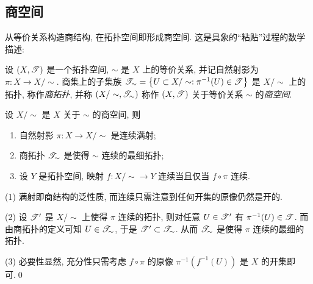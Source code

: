\subsection{商空间}

    从等价关系构造商结构, 在拓扑空间即形成商空间. 这是具象的``粘贴''过程的数学描述:

    \begin{Definition}[商空间]
        设 $ (X,\mathscr{T}) $ 是一个拓扑空间, $ \sim $ 是 $ X $ 上的等价关系, 并记自然射影为 $ \pi : X\to X/\sim $. 商集上的子集族 $ \mathscr{T}_\sim=\left\{ U\subset X/\sim : \pi^{-1}(U)\in\mathscr{T} \right\} $ 是 $ X/\sim $ 上的拓扑, 称作\emph{商拓扑}, 并称 $ (X/\sim,\mathscr{T}_\sim) $ 称作 $ (X,\mathscr{T}) $ 关于等价关系 $ \sim $ 的\emph{商空间}.
    \end{Definition}

    \begin{Proposition}
        设 $ X/\sim $ 是 $ X $ 关于 $ \sim $ 的商空间, 则
        \begin{enumerate}
            \item 自然射影 $ \pi : X\to X/\sim $ 是连续满射;
            \item 商拓扑 $ \mathscr{T}_\sim $ 是使得 $ \sim $ 连续的最细拓扑;
            \item 设 $ Y $ 是拓扑空间, 映射 $ f : X/\sim\to Y $ 连续当且仅当 $ f\circ\pi $ 连续.
        \end{enumerate}
        \begin{center}
        \end{center}
    \end{Proposition}
    \begin{Proof}
        (1) 满射即商结构的泛性质, 而连续只需注意到任何开集的原像仍然是开的.

        (2) 设 $ \mathscr{T}' $ 是 $ X/\sim $ 上使得 $ \pi $ 连续的拓扑, 则对任意 $ U\in\mathscr{T}' $ 有 $ \pi^{-1}(U)\in\mathscr{T} $. 而由商拓扑的定义可知 $ U\in\mathscr{T}_\sim $, 于是 $ \mathscr{T}'\subset\mathscr{T}_\sim $. 从而 $ \mathscr{T}_\sim $ 是使得 $ \pi $ 连续的最细的拓扑.

        (3) 必要性显然, 充分性只需考虑 $ f\circ\pi $ 的原像 $ \pi^{-1}(f^{-1}(U)) $ 是 $ X $ 的开集即可.\qed
    \end{Proof}


